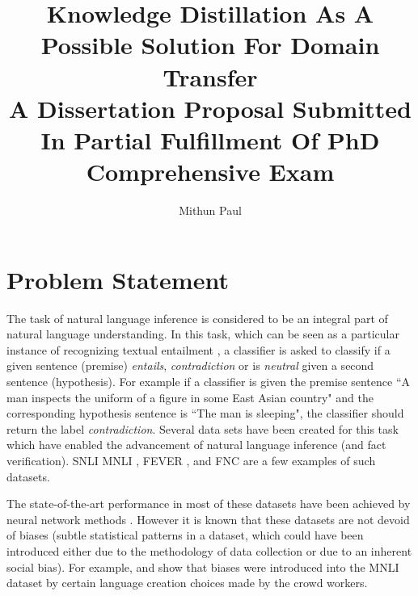 \documentclass{article}
\begin{document}
\title{Knowledge Distillation As A Possible Solution For Domain Transfer  \\
\large{A Dissertation Proposal Submitted In Partial Fulfillment Of PhD Comprehensive Exam \\
}}
\author{Mithun Paul\\}



\maketitle

\tableofcontents

\section{Problem Statement}


The task of natural language inference is considered to be an integral part of natural language understanding. In this task, which can be seen as a particular instance of recognizing textual entailment \citep*{fyodorov2000natural,condoravdi2003entailment,bos2005recognising,maccartney2009extended,dagan2013recognizing}, a classifier is asked to classify if a given sentence (premise) \textit{entails}, \textit{contradiction} or is \textit{neutral} given a second sentence (hypothesis). For example if a classifier is given the premise sentence ``A man inspects the uniform of a figure in some East Asian country" and the corresponding hypothesis sentence is ``The man is sleeping", the classifier should return the label  \textit{contradiction}. Several data sets have been created for this task which have enabled the advancement of natural language inference (and fact verification).  SNLI \citep*{bowman2015large} MNLI \citep*{williams2017broad}, FEVER \citep*{thorne2018fever}, and FNC \citep*{pomerleau2017fake} are a few examples of such datasets. 



The state-of-the-art  performance in most of these datasets have been achieved by  neural network methods \citep*{kim2018semantic,chen2016enhanced,liu2019multi}. However it is known that these datasets are not devoid of biases (subtle statistical patterns in a dataset, which could have been introduced either due to the methodology of data collection or due to an inherent social bias). For example, \citep*{gururangan2018annotation} and \citep*{poliak2018hypothesis} show that biases were introduced into the MNLI dataset by certain language creation choices made by the crowd workers. 
\end{document}
